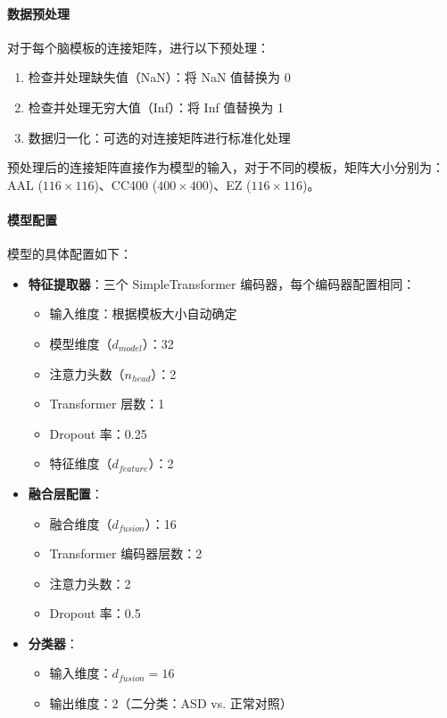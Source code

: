 \documentclass[12pt,a4paper]{article}
\begin{document}
\paragraph{数据预处理}
对于每个脑模板的连接矩阵，进行以下预处理：
\begin{enumerate}
\item 检查并处理缺失值（NaN）：将 NaN 值替换为 0
\item 检查并处理无穷大值（Inf）：将 Inf 值替换为 1
\item 数据归一化：可选的对连接矩阵进行标准化处理
\end{enumerate}

预处理后的连接矩阵直接作为模型的输入，对于不同的模板，矩阵大小分别为：AAL ($116 \times 116$)、CC400 ($400 \times 400$)、EZ ($116 \times 116$)。

\paragraph{模型配置}
模型的具体配置如下：

\begin{itemize}
\item \textbf{特征提取器}：三个 SimpleTransformer 编码器，每个编码器配置相同：
  \begin{itemize}
  \item 输入维度：根据模板大小自动确定
  \item 模型维度（$d_{model}$）：32
  \item 注意力头数（$n_{head}$）：2
  \item Transformer 层数：1
  \item Dropout 率：0.25
  \item 特征维度（$d_{feature}$）：2
  \end{itemize}

\item \textbf{融合层配置}：
  \begin{itemize}
  \item 融合维度（$d_{fusion}$）：16
  \item Transformer 编码器层数：2
  \item 注意力头数：2
  \item Dropout 率：0.5
  \end{itemize}

\item \textbf{分类器}：
  \begin{itemize}
  \item 输入维度：$d_{fusion} = 16$
  \item 输出维度：2（二分类：ASD vs. 正常对照）
  \end{itemize}
\end{itemize}
\end{document}
